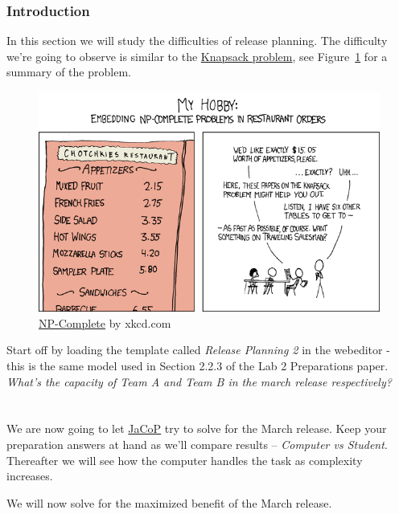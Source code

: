 \documentclass[11pt]{article}
\begin{document}
%
%
\subsubsection{Introduction}\label{section:rp-introduction}
In this section we will study the difficulties of release planning. The difficulty we're going to observe is similar to the \href{https://en.wikipedia.org/wiki/Knapsack_problem}{Knapsack problem}, see Figure~\ref{fig:xkcd-287} for a summary of the problem.

\begin{figure}[h]
    \centering
    \includegraphics[width=\textwidth]{np_complete.png}
    \caption{\href{https://xkcd.com/287/}{NP-Complete} by xkcd.com}
    \label{fig:xkcd-287}
\end{figure}

Start off by loading the template called \textit{Release Planning 2} in the webeditor - this is the same model used in Section 2.2.3 of the Lab 2 Preparations paper.\\

\noindent\textit{What's the capacity of Team A and Team B in the march release respectively?}\\ \\
\underline{\hspace{0.9\textwidth}}\\

We are now going to let \href{http://www.lth.se/jacop}{JaCoP} try to solve for the March release. Keep your preparation answers at hand as we'll compare results -- \textit{Computer vs Student}. Thereafter we will see how the computer handles the task as complexity increases.

We will now solve for the maximized benefit of the March release.
\end{document}
